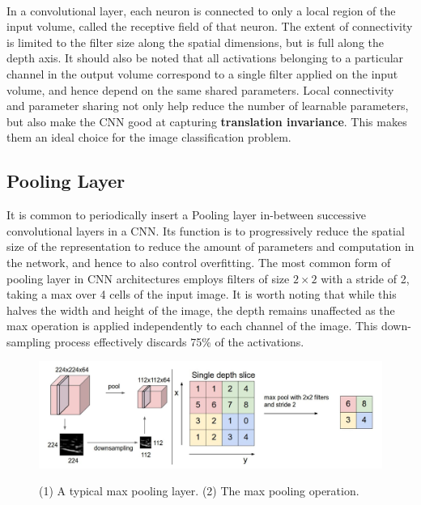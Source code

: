 \documentclass[12pt, a4paper]{report}
\begin{document}
\paragraph{}
In a convolutional layer, each neuron is connected to only a local region of the input volume, called the receptive field of that neuron. The extent of connectivity is limited to the filter size along the spatial dimensions, but is full along the depth axis.\cite{cs231n} It should also be noted that all activations belonging to a particular channel in the output volume correspond to a single filter applied on the input volume, and hence depend on the same shared parameters. Local connectivity and parameter sharing not only help reduce the number of learnable parameters, but also make the CNN good at capturing \textbf{translation invariance}. This makes them an ideal choice for the image classification problem.
\subsection{Pooling Layer}
It is common to periodically insert a Pooling layer in-between successive convolutional layers in a CNN. Its function is to progressively reduce the spatial size of the representation to reduce the amount of parameters and computation in the network, and hence to also control overfitting.\cite{cs231n} The most common form of pooling layer in CNN architectures employs filters of size $2 \times 2$ with a stride of 2, taking a max over 4 cells of the input image. It is worth noting that while this halves the width and height of the image, the depth remains unaffected as the max operation is applied independently to each channel of the image. This down-sampling process effectively discards 75\% of the activations.
\begin{figure}[h]
\centering
\includegraphics[width=\textwidth]{cnn2.jpg}
\caption{(1) A typical max pooling layer. (2) The max pooling operation.}\cite{cs231n}
\end{figure}
\end{document}
